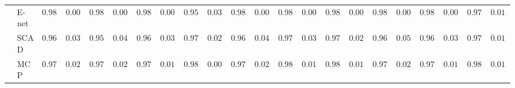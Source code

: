 \begin{tabular}{ll|ll|llllll|llllll|llllll}
 & E-net  & $0.9895$ & $0.0000$ & $0.9888$ & $0.0036$ & $0.9879$ & $0.0057$ & $0.9527$ & $0.0315$ & $0.9895$ & $0.0000$ & $0.9894$ & $0.0011$ & $0.9857$ & $0.0059$ & $0.9894$ & $0.0011$ & $0.9889$ & $0.0031$ & $0.9743$ & $0.0167$ \\
 & SCAD  & $0.9666$ & $0.0371$ & $0.9579$ & $0.0413$ & $0.9633$ & $0.0325$ & $0.9755$ & $0.0219$ & $0.9656$ & $0.0423$ & $0.9734$ & $0.0355$ & $0.9783$ & $0.0217$ & $0.9612$ & $0.0508$ & $0.9639$ & $0.0364$ & $0.9771$ & $0.0171$ \\
 & MCP  & $0.9777$ & $0.0240$ & $0.9749$ & $0.0246$ & $0.9786$ & $0.0184$ & $0.9837$ & $0.0081$ & $0.9762$ & $0.0279$ & $0.9834$ & $0.0167$ & $0.9832$ & $0.0126$ & $0.9749$ & $0.0296$ & $0.9781$ & $0.0199$ & $0.9818$ & $0.0115$ \\
\hline 
\end{tabular}

